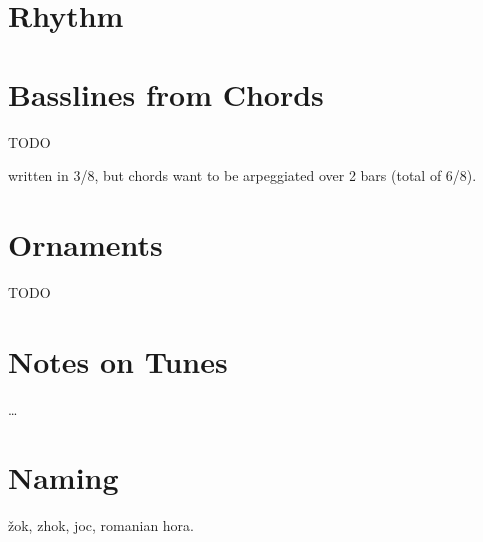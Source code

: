 
\section{Rhythm}
\begin{center}
\end{center}

\begin{center}
\end{center}

\section{Basslines from Chords}
TODO

written in 3/8, but chords want to be arpeggiated over 2 bars (total of 6/8).
\section{Ornaments}
TODO

\section{Notes on Tunes}
\begin{description}[noitemsep]
\item[TODO] \dots
\end{description}

\section{Naming}
žok, zhok, joc, romanian hora.

